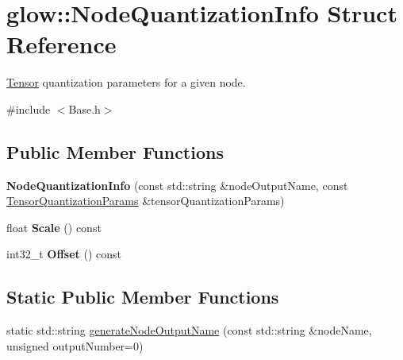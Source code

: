 \hypertarget{structglow_1_1_node_quantization_info}{}\section{glow\+:\+:Node\+Quantization\+Info Struct Reference}
\label{structglow_1_1_node_quantization_info}


\hyperlink{classglow_1_1_tensor}{Tensor} quantization parameters for a given node.  




{\ttfamily \#include $<$Base.\+h$>$}

\subsection*{Public Member Functions}
\begin{DoxyCompactItemize}
\item 
\mbox{\label{structglow_1_1_node_quantization_info_af4df818cf66c1ba584a3ac7f6b1f9cdd}} 
{\bfseries Node\+Quantization\+Info} (const std\+::string \&node\+Output\+Name, const \hyperlink{structglow_1_1_tensor_quantization_params}{Tensor\+Quantization\+Params} \&tensor\+Quantization\+Params)
\item 
\mbox{\label{structglow_1_1_node_quantization_info_a40a5e8af87fea2fae5b2a6478da9b4ee}} 
float {\bfseries Scale} () const
\item 
\mbox{\label{structglow_1_1_node_quantization_info_a789d67eff0049ec18564ff8be7b425c9}} 
int32\+\_\+t {\bfseries Offset} () const
\end{DoxyCompactItemize}
\subsection*{Static Public Member Functions}
\begin{DoxyCompactItemize}
\item 
static std\+::string \hyperlink{structglow_1_1_node_quantization_info_a95eecb61266bd5b736d50b7904a6c95d}{generate\+Node\+Output\+Name} (const std\+::string \&node\+Name, unsigned output\+Number=0)
\end{DoxyCompactItemize}
